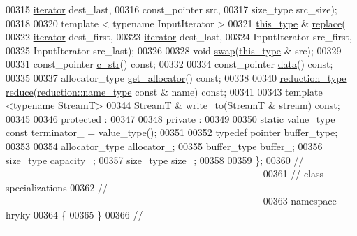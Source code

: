 \begin{DoxyCode}
00315         \hyperlink{classhryky_1_1iterator_1_1random_1_1_mutable}{iterator} dest\_last,
00316         const\_pointer src,
00317         size\_type src\_size);
00318 
00320     \textcolor{keyword}{template} < \textcolor{keyword}{typename} InputIterator >
00321     \hyperlink{classhryky_1_1_string}{this_type} & \hyperlink{classhryky_1_1_string_a09705c9ae9b2a6eb030421830be1a6ad}{replace}(
00322         \hyperlink{classhryky_1_1iterator_1_1random_1_1_mutable}{iterator} dest\_first,
00323         \hyperlink{classhryky_1_1iterator_1_1random_1_1_mutable}{iterator} dest\_last,
00324         InputIterator src\_first,
00325         InputIterator src\_last);
00326 
00328     \textcolor{keywordtype}{void} \hyperlink{classhryky_1_1_string_a5ff47f11c86f2cf71e7e2d1427c1474b}{swap}(\hyperlink{classhryky_1_1_string}{this_type} & src);
00329 
00331     const\_pointer \hyperlink{classhryky_1_1_string_a6cbb3af33227054fa85010603cbfa430}{c_str}() \textcolor{keyword}{const};
00332 
00334     const\_pointer \hyperlink{classhryky_1_1_string_af61f2a74347fabebd76f9fa810341724}{data}() \textcolor{keyword}{const};
00335 
00337     allocator\_type \hyperlink{classhryky_1_1_string_a710ee15ff97ece02e764e0be568522bc}{get_allocator}() \textcolor{keyword}{const};
00338 
00340     \hyperlink{classhryky_1_1_intrusive_ptr}{reduction_type} \hyperlink{classhryky_1_1_string_a03adae56f3604b70e4cf17c8473c667a}{reduce}(\hyperlink{classhryky_1_1reduction_1_1_string}{reduction::name_type} \textcolor{keyword}{const} & name) \textcolor{keyword}{const};
00341 
00343     \textcolor{keyword}{template} <\textcolor{keyword}{typename} StreamT>
00344     StreamT & \hyperlink{classhryky_1_1_string_a5632cb3b6a55de35a0d2c03ddbe8f75e}{write_to}(StreamT & stream) \textcolor{keyword}{const};
00345 
00346 \textcolor{keyword}{protected} :
00347 
00348 \textcolor{keyword}{private} :
00349 
00350     \textcolor{keyword}{static} value\_type \textcolor{keyword}{const} terminator\_ = value\_type();
00351 
00352     \textcolor{keyword}{typedef} pointer buffer\_type;
00353 
00354     allocator\_type  allocator\_;
00355     buffer\_type     buffer\_;
00356     size\_type       capacity\_;
00357     size\_type       size\_;
00358 
00359 \};
00360 \textcolor{comment}{//
      ------------------------------------------------------------------------------}
00361 \textcolor{comment}{// class specializations}
00362 \textcolor{comment}{//
      ------------------------------------------------------------------------------}
00363 \textcolor{keyword}{namespace }hryky
00364 \{
00365 \}
00366 \textcolor{comment}{//
      ------------------------------------------------------------------------------}

\end{DoxyCode}
